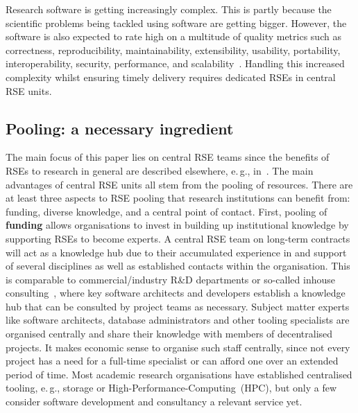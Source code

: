 \documentclass[10pt,letterpaper]{article}
\newcommand*{\eg}{e.\,g.,\xspace}
\begin{document}
Research software is getting increasingly complex.
This is partly because the scientific problems being tackled using software are getting bigger.
However, the software is also expected to rate high on a multitude of quality metrics such as correctness, reproducibility, maintainability, extensibility, usability, portability, interoperability, security, performance, and scalability~\cite[Chapter 16]{Schulmeyer2008}.
Handling this increased complexity whilst ensuring timely delivery requires dedicated RSEs in central RSE units.

\subsection*{Pooling: a necessary ingredient}
The main focus of this paper lies on central RSE teams since the benefits of RSEs to research in general are described elsewhere, \eg{} in~\cite{Anzt2021}.
The main advantages of central RSE units all stem from the pooling of resources.
There are at least three aspects to RSE pooling that research institutions can benefit from: funding, diverse knowledge, and a central point of contact.
First, pooling of \textbf{funding} allows organisations to invest in building up institutional knowledge by supporting RSEs to become experts.
A central RSE team on long-term contracts will act as a knowledge hub due to their accumulated experience in and support of several disciplines as well as established contacts within the organisation.
This is comparable to commercial/industry R\&D departments or so-called inhouse consulting~\cite{Grima_2011}, where key software architects and developers establish a knowledge hub that can be consulted by project teams as necessary.
Subject matter experts like software architects, database administrators and other tooling specialists are organised centrally and share their knowledge with members of decentralised projects.
It makes economic sense to organise such staff centrally, since not every project has a need for a full-time specialist or can afford one over an extended period of time.
Most academic research organisations have established centralised tooling, \eg{} storage or High-Performance-Computing\ (HPC), but only a few consider software development and consultancy a relevant service yet.
\end{document}
